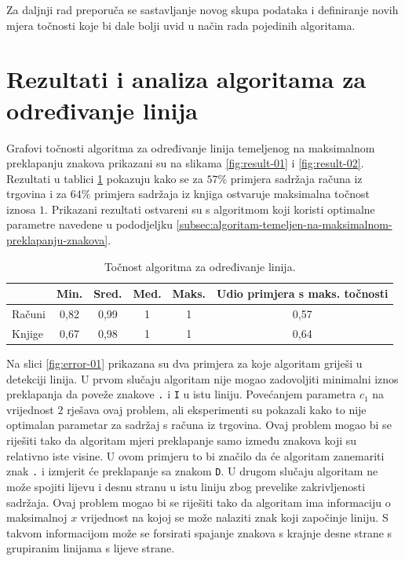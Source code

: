 \documentclass[times, utf8, zavrsni]{fer}
\begin{document}
Za daljnji rad preporuča se sastavljanje novog skupa podataka i definiranje
novih mjera točnosti koje bi dale bolji uvid u način rada pojedinih algoritama.

\pagebreak








\section{Rezultati i analiza algoritama za određivanje linija}
\label{sec:rezultati-i-analiza-algoritama-za-odredivanje-linija}
Grafovi točnosti algoritma za određivanje linija temeljenog na maksimalnom
preklapanju znakova prikazani su na slikama \ref{fig:result-01} i
\ref{fig:result-02}. Rezultati u tablici \ref{tbl:result-01} pokazuju kako se
za $57\%$ primjera sadržaja računa iz trgovina i za $64\%$ primjera sadržaja iz
knjiga ostvaruje maksimalna
točnost iznosa $1$. Prikazani rezultati ostvareni su s algoritmom koji koristi
optimalne parametre navedene u pododjeljku
\ref{subsec:algoritam-temeljen-na-maksimalnom-preklapanju-znakova}.

\begin{table}[htb]
\caption{Točnost algoritma za određivanje linija.}
\label{tbl:result-01}
\centering
\begin{tabular}{lccccc} \hline
& Min. & Sred. & Med. & Maks. & Udio primjera s maks. točnosti \\ \hline
Računi & 0,82 & 0,99 & 1 & 1 & 0,57 \\
Knjige & 0,67 & 0,98 & 1 & 1 & 0,64 \\ \hline
\end{tabular}
\end{table}

Na slici \ref{fig:error-01} prikazana su dva primjera za koje algoritam griješi
u detekciji linija. U prvom slučaju algoritam nije mogao zadovoljiti minimalni
iznos preklapanja da poveže znakove \lstinline{.} i \lstinline{I} u istu
liniju. Povećanjem parametra $c_1$ na vrijednost $2$ rješava ovaj problem,
ali eksperimenti su pokazali kako to nije optimalan parametar za sadržaj s
računa iz trgovina. Ovaj problem mogao bi se riješiti tako da algoritam mjeri
preklapanje samo između znakova koji su relativno iste visine. U ovom primjeru
to bi značilo da će algoritam zanemariti znak \lstinline{.} i izmjerit će
preklapanje sa znakom \lstinline{D}. U drugom slučaju algoritam ne može spojiti
lijevu i desnu stranu u istu liniju zbog prevelike zakrivljenosti sadržaja.
Ovaj problem mogao bi se riješiti tako da algoritam ima informaciju o
maksimalnoj $x$ vrijednost na kojoj se može nalaziti znak koji započinje
liniju. S takvom informacijom može se forsirati spajanje znakova s krajnje
desne strane s grupiranim linijama s lijeve strane.
\end{document}
